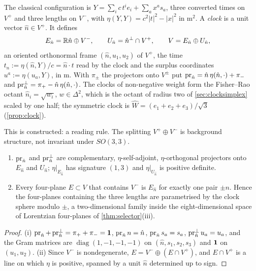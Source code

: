 \begin{definition}
\label{r2:def:config}
The classical configuration is $Y=\sum_ic\,t^ie_i+\sum_ax^as_a$, three converted times on $V^+$ and three lengths on $V^-$, with
$\eta(Y,Y)=c^2|t|^2-|x|^2$ in $\mathrm m^2$. A \emph{clock} is a unit vector $\hat n\in V^+$. It defines
\[
E_{\hat n}=\mathbb{R} \hat n\oplus V^-,\qquad U_{\hat n}=\hat n^\perp\cap V^+,\qquad V=E_{\hat n}\oplus U_{\hat n} ,
\]
an oriented orthonormal frame $(\hat n,u_1,u_2)$ of $V^+$, the time $t_{\hat n}:=\eta(\hat n,Y)/c=\hat n\cdot t$ read by the clock and the surplus coordinates
$u^a:=\eta(u_a,Y)$, in $\mathrm m$. With $\pi_\pm$ the projectors onto $V^\pm$ put $\operatorname{pr}_{\hat n}=\hat n\,\eta(\hat n,\cdot)+\pi_-$ and $\operatorname{pr}^{\perp}_{\hat n}=\pi_+-\hat n\,\eta(\hat n,\cdot)$.
The clocks of non-negative weight form the Fisher--Rao octant $\hat n_i=\sqrt{w_i}$, $w\in\Delta^2$, which is the octant of radius two of \cref{sec:clocksimplex} scaled by one half; the symmetric clock is $\widehat W=(e_1+e_2+e_3)/\sqrt3$ (\cref{prop:clock}).
\end{definition}

This is constructed: a reading rule. The splitting $V^+\oplus V^-$ is
background structure, not invariant under $SO(3,3)$.

\begin{proposition}
\label{r2:prop:planes}
\begin{enumerate}[label=(\roman*),leftmargin=2.2em]
\item $\operatorname{pr}_{\hat n}$ and $\operatorname{pr}^{\perp}_{\hat n}$ are complementary, $\eta$-self-adjoint, $\eta$-orthogonal projectors onto $E_{\hat n}$ and $U_{\hat n}$; $\eta|_{E_{\hat n}}$ has
signature $(1,3)$ and $\eta|_{U_{\hat n}}$ is positive definite.
\item Every four-plane $E\subset V$ that contains $V^-$ is $E_{\hat n}$ for exactly one pair $\pm \hat n$. Hence the four-planes containing the three lengths are
parametrised by the clock sphere modulo $\pm$, a two-dimensional family inside the eight-dimensional space of Lorentzian four-planes of
\cref{thm:selector}(iii).
\end{enumerate}
\end{proposition}

\begin{proof}
(i) $\operatorname{pr}_{\hat n}+\operatorname{pr}^{\perp}_{\hat n}=\pi_++\pi_-=\mathbf 1$, $\operatorname{pr}_{\hat n}n=\hat n$, $\operatorname{pr}_{\hat n}s_a=s_a$, $\operatorname{pr}^{\perp}_{\hat n}u_a=u_a$, and the Gram matrices are
$\operatorname{diag}(1,-1,-1,-1)$ on $(\hat n,s_1,s_2,s_3)$ and $\mathbf 1$ on $(u_1,u_2)$. (ii) Since $V^-$ is nondegenerate, $E=V^-\oplus(E\cap V^+)$, and
$E\cap V^+$ is a line on which $\eta$ is positive, spanned by a unit $\hat n$ determined up to sign.
\end{proof}

